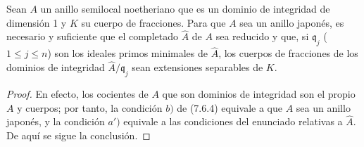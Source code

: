 \begin{corollary}[7.6.6]
\label{IV.2.s7.6.6-fr}
Sean $A$ un anillo semilocal noetheriano que es un dominio de integridad de
dimensión 1 y $K$ su cuerpo de fracciones. Para que $A$ sea un anillo japonés,
es necesario y suficiente que el completado $\widehat A$
de $A$ sea reducido y que, si $\mathfrak q_j$ \textup{(}$1\leq j\leq n$\textup{)} son los
ideales primos minimales de $\widehat A$, los cuerpos de fracciones de los
dominios de integridad $\widehat A/\mathfrak q_j$ sean extensiones separables
de $K$.
\end{corollary}

\begin{proof}
En efecto, los cocientes de $A$ que son dominios de integridad son el propio
$A$ y cuerpos; por tanto, la condición $b)$ de (7.6.4) equivale a que $A$ sea
un anillo japonés, y la condición $a')$ equivale a las condiciones del
enunciado relativas a $\widehat A$. De aquí se sigue la conclusión.
\end{proof}
